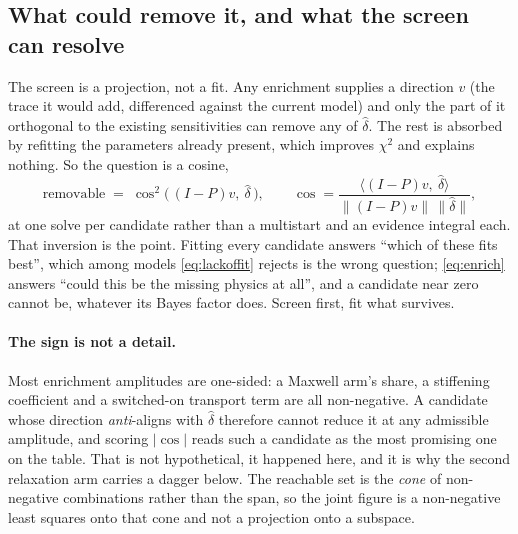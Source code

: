 \documentclass[10pt]{article}
\begin{document}
\subsection{What could remove it, and what the screen can resolve}
\label{sec:screenres}

The screen is a projection, not a fit. Any enrichment supplies a direction $v$ (the trace it
would add, differenced against the current model) and only the part of it orthogonal to the
existing sensitivities can remove any of $\hat\delta$. The rest is absorbed by refitting the
parameters already present, which improves $\chi^2$ and explains nothing. So the question is a
cosine,
%
\begin{equation}
\text{removable} \;=\; \cos^2\!\big(\,(I-P)v,\ \hat\delta\,\big),
\qquad
\cos = \frac{\langle (I-P)v,\ \hat\delta\rangle}{\lVert (I-P)v\rVert\,\lVert\hat\delta\rVert} ,
\label{eq:enrich}
\end{equation}
%
at one solve per candidate rather than a multistart and an evidence integral each. That
inversion is the point. Fitting every candidate answers ``which of these fits best'', which
among models \cref{eq:lackoffit} rejects is the wrong question; \eqref{eq:enrich} answers
``could this be the missing physics at all'', and a candidate near zero cannot be, whatever its
Bayes factor does. Screen first, fit what survives.

\paragraph{The sign is not a detail.} Most enrichment amplitudes are one-sided: a Maxwell arm's
share, a stiffening coefficient and a switched-on transport term are all non-negative. A
candidate whose direction \emph{anti}-aligns with $\hat\delta$ therefore cannot reduce it at any
admissible amplitude, and scoring $\lvert\cos\rvert$ reads such a candidate as the most
promising one on the table. That is not hypothetical, it happened here, and it is why the
second relaxation arm carries a dagger below. The reachable set is the \emph{cone} of
non-negative combinations rather than the span, so the joint figure is a non-negative least
squares onto that cone and not a projection onto a subspace.
\end{document}
